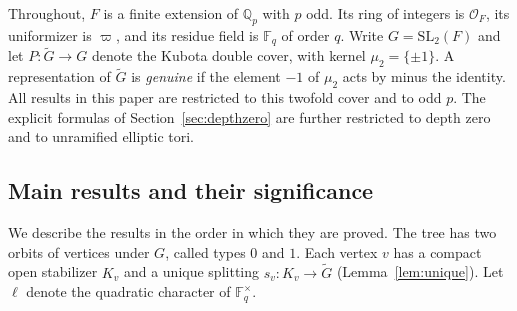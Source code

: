 \documentclass[12pt,letterpaper]{article}
\numberwithin{equation}{section}
\theoremstyle{definition}
\theoremstyle{remark}
\newcommand{\OO}{\mathcal O_F}
\newcommand{\kk}{\mathbb F_q}
\newcommand{\Mp}{\widetilde G}
\begin{document}
Throughout, $F$ is a finite extension of $\mathbb Q_p$ with $p$ odd. Its ring of integers is $\OO$, its uniformizer is $\varpi$, and its residue field is $\kk$ of order $q$. Write $G=\mathrm{SL}_2(F)$ and let $P:\Mp\to G$ denote the Kubota double cover, with kernel $\mu_2=\{\pm1\}$. A representation of $\Mp$ is \emph{genuine} if the element $-1$ of $\mu_2$ acts by minus the identity. All results in this paper are restricted to this twofold cover and to odd $p$. The explicit formulas of Section~\ref{sec:depthzero} are further restricted to depth zero and to unramified elliptic tori.

\subsection{Main results and their significance}
We describe the results in the order in which they are proved. The tree has two orbits of vertices under $G$, called types $0$ and $1$. Each vertex $v$ has a compact open stabilizer $K_v$ and a unique splitting $s_v:K_v\to\Mp$ (Lemma~\ref{lem:unique}). Let $\ell$ denote the quadratic character of $\kk^\times$.
\end{document}
